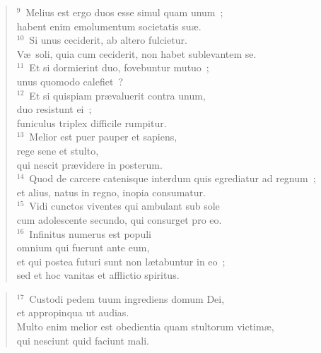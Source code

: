 \begin{verse}${}^{9}$~Melius est ergo duos esse simul quam unum~;\\ habent enim emolumentum societatis su\ae .\\
${}^{10}$~Si unus ceciderit, ab altero fulcietur.\\ V\ae\ soli, quia cum ceciderit, non habet sublevantem se.\\
${}^{11}$~Et si dormierint duo, fovebuntur mutuo~;\\ unus quomodo calefiet~?\\
${}^{12}$~Et si quispiam pr\ae valuerit contra unum,\\ duo resistunt ei~;\\ funiculus triplex difficile rumpitur.\\
${}^{13}$~Melior est puer pauper et sapiens,\\ rege sene et stulto,\\ qui nescit pr\ae videre in posterum.\\
${}^{14}$~Quod de carcere catenisque interdum quis egrediatur ad regnum~;\\ et alius, natus in regno, inopia consumatur.\\
${}^{15}$~Vidi cunctos viventes qui ambulant sub sole\\ cum adolescente secundo, qui consurget pro eo.\\
${}^{16}$~Infinitus numerus est populi\\ omnium qui fuerunt ante eum,\\ et qui postea futuri sunt non l\ae tabuntur in eo~;\\ sed et hoc vanitas et afflictio spiritus.\end{verse}


\begin{verse}${}^{17}$~Custodi pedem tuum ingrediens domum Dei,\\ et appropinqua ut audias.\\ Multo enim melior est obedientia quam stultorum victim\ae ,\\ qui nesciunt quid faciunt mali.\end{verse}


